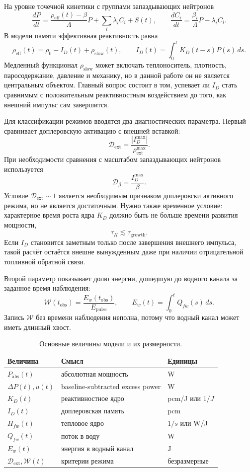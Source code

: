 \documentclass[12pt]{article}
\begin{document}
На уровне точечной кинетики с группами запаздывающих нейтронов \cite{DuderstadtHamilton1976}
\[
\frac{dP}{dt}=
\frac{\rho_{\mathrm{eff}}(t)-\beta}{\Lambda}P
+
\sum_i\lambda_iC_i+S(t),
\qquad
\frac{dC_i}{dt}=
\frac{\beta_i}{\Lambda}P-\lambda_iC_i.
\]
В модели памяти эффективная реактивность равна
\[
\rho_{\mathrm{eff}}(t)=
\rho_0-I_D(t)+\rho_{\mathrm{slow}}(t),
\qquad
I_D(t)=\int_0^tK_D(t-s)P(s)\,ds.
\]
Медленный функционал \(\rho_{\mathrm{slow}}\) может включать теплоноситель, плотность, паросодержание, давление и механику, но в данной работе он не является центральным объектом. Главный вопрос состоит в том, успевает ли \(I_D\) стать сравнимым с положительным реактивностным воздействием до того, как внешний импульс сам завершится.

Для классификации режимов вводятся два диагностических параметра. Первый сравнивает доплеровскую активацию с внешней вставкой:
\[
\mathcal D_{\mathrm{ext}}=
\frac{|I_D^{\max}|}{\rho_{\mathrm{ext}}^{\max}}.
\]
При необходимости сравнения с масштабом запаздывающих нейтронов используется
\[
\mathcal D_\beta=
\frac{I_D^{\max}}{\beta}.
\]
Условие \(\mathcal D_{\mathrm{ext}}\sim1\) является необходимым признаком доплеровски активного режима, но не является достаточным. Нужно также временное условие: характерное время роста ядра \(K_D\) должно быть не больше времени развития мощности,
\[
\tau_K \lesssim \tau_{\mathrm{growth}}.
\]
Если \(I_D\) становится заметным только после завершения внешнего импульса, такой расчёт остаётся внешне вынужденным даже при наличии отрицательной топливной обратной связи.

Второй параметр показывает долю энергии, дошедшую до водного канала за заданное время наблюдения:
\[
\mathcal W(t_{\mathrm{obs}})=
\frac{E_w(t_{\mathrm{obs}})}{E_{\mathrm{pulse}}},
\qquad
E_w(t)=\int_0^tQ_{fw}(s)\,ds.
\]
Запись \(\mathcal W\) без времени наблюдения неполна, потому что водный канал может иметь длинный хвост.

\begin{table}[H]
\centering
\caption{Основные величины модели и их размерности.}
\label{tab:units}
\begin{tabular}{|>{\centering\arraybackslash}p{3.1cm}|p{6.4cm}|>{\centering\arraybackslash}p{3.0cm}|}
\hline
Величина & Смысл & Единицы\\
\hline
\(P_{\mathrm{abs}}(t)\) & абсолютная мощность & W\\
\(\Delta P(t), u(t)\) & baseline-subtracted excess power & W\\
\(K_D(t)\) & реактивностное ядро & pcm/J или \(1/J\)\\
\(I_D(t)\) & доплеровская память & pcm\\
\(H_{fw}(t)\) & тепловое ядро & \(1/s\) или W/J\\
\(Q_{fw}(t)\) & поток в воду & W\\
\(E_w(t)\) & энергия в водный канал & J\\
\(\mathcal D_{\mathrm{ext}}, \mathcal W(t)\) & критерии режима & безразмерные\\
\hline
\end{tabular}
\end{table}
\end{document}
